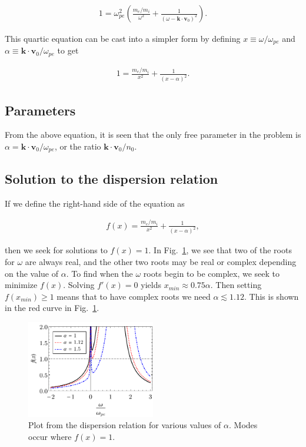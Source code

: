 \documentclass[12pt]{article}
\newcommand{\mb}{\mathbf}
\begin{document}
\begin{align*}
1 = \omega_{pe}^2 \left(\frac{m_e/m_i}{\omega^2} + \frac{1}{(\omega - \mb{k} \cdot \mb{v}_0)^2}\right).
\end{align*}

This quartic equation can be cast into a simpler form by defining $x \equiv \omega/\omega_{pe}$ and $\alpha \equiv \mb{k} \cdot \mb{v}_0/\omega_{pe}$ to get

\begin{align*}
1 = \frac{m_e/m_i}{x^2} + \frac{1}{(x-\alpha)^2}.
\end{align*}

\subsection*{Parameters}

From the above equation, it is seen that the only free parameter in the problem is $\alpha = \mb{k} \cdot \mb{v}_0/\omega_{pe}$, or the ratio $\mb{k} \cdot \mb{v}_0/n_0$.

\subsection*{Solution to the dispersion relation}

If we define the right-hand side of the equation as

\begin{align*}
f(x) = \frac{m_e/m_i}{x^2} + \frac{1}{(x-\alpha)^2},
\end{align*}

then we seek for solutions to $f(x) = 1$. In Fig.~\ref{fig:Buneman}, we see that two of the roots for $\omega$ are always real, and the other two roots may be real or complex depending on the value of $\alpha$. To find when the $\omega$ roots begin to be complex, we seek to minimize $f(x)$. Solving $f'(x)=0$ yields $x_{min} \approx 0.75\alpha$. Then setting $f(x_{min}) \geq 1$ means that to have complex roots we need $\alpha \lesssim 1.12$. This is shown in the red curve in Fig.~\ref{fig:Buneman}.

\begin{figure}
	\centering
	\includegraphics[width=0.5\textwidth]{two_stream_disp}
	\caption{\label{fig:Buneman} Plot from the dispersion relation for various values of $\alpha$. Modes occur where $f(x)=1$.}
\end{figure}
\end{document}
